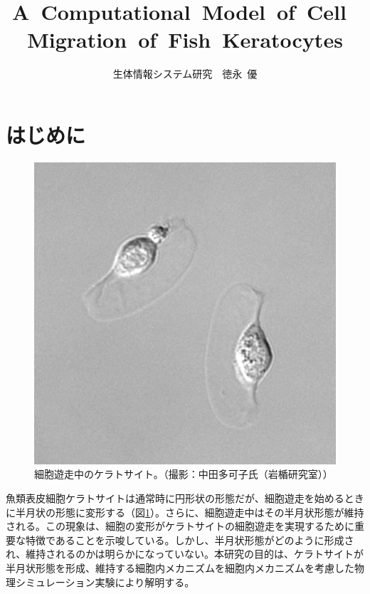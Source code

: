 \documentclass[10pt,twocolumn,a4j]{jarticle}
\title{A~Computational~Model~of~Cell~Migration~of~Fish~Keratocytes}
\author{生体情報システム研究~~徳永~優}
\date{}
\begin{document}
\maketitle
\section{はじめに}
\begin{figure}[tbp]
\centering
\includegraphics[scale=0.4]{kera.eps}
\caption{細胞遊走中のケラトサイト。（撮影：中田多可子氏（岩楯研究室））}
\label{fig:kera}
\end{figure}
魚類表皮細胞ケラトサイトは通常時に円形状の形態だが、細胞遊走を始めるときに半月状の形態に変形する（図\ref{fig:kera}）。さらに、細胞遊走中はその半月状形態が維持される。この現象は、細胞の変形がケラトサイトの細胞遊走を実現するために重要な特徴であることを示唆している。しかし、半月状形態がどのように形成され、維持されるのかは明らかになっていない。本研究の目的は、ケラトサイトが半月状形態を形成、維持する細胞内メカニズムを細胞内メカニズムを考慮した物理シミュレーション実験により解明する。
\end{document}
